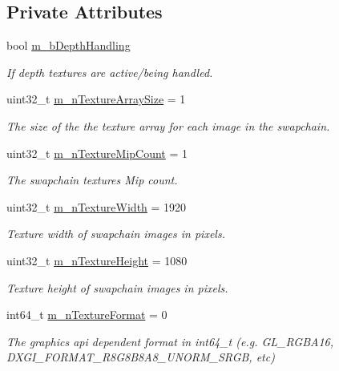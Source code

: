 \subsection*{Private Attributes}
\begin{DoxyCompactItemize}
\item 
bool \mbox{\hyperlink{class_open_x_r_provider_1_1_x_r_render_manager_a4d4e6d227ba36b18b9c25321ab5c21c1}{m\+\_\+b\+Depth\+Handling}}
\begin{DoxyCompactList}\small\item\em If depth textures are active/being handled. \end{DoxyCompactList}\item 
uint32\+\_\+t \mbox{\hyperlink{class_open_x_r_provider_1_1_x_r_render_manager_adcd4b8ab0842133a0e2875b0aab2f68b}{m\+\_\+n\+Texture\+Array\+Size}} = 1
\begin{DoxyCompactList}\small\item\em The size of the the texture array for each image in the swapchain. \end{DoxyCompactList}\item 
uint32\+\_\+t \mbox{\hyperlink{class_open_x_r_provider_1_1_x_r_render_manager_a51f67678cd3a65f4dfc92f62b32aac17}{m\+\_\+n\+Texture\+Mip\+Count}} = 1
\begin{DoxyCompactList}\small\item\em The swapchain textures\textquotesingle{} Mip count. \end{DoxyCompactList}\item 
uint32\+\_\+t \mbox{\hyperlink{class_open_x_r_provider_1_1_x_r_render_manager_a2194cf35100c01e5fe28d9fedac9e2c4}{m\+\_\+n\+Texture\+Width}} = 1920
\begin{DoxyCompactList}\small\item\em Texture width of swapchain images in pixels. \end{DoxyCompactList}\item 
uint32\+\_\+t \mbox{\hyperlink{class_open_x_r_provider_1_1_x_r_render_manager_ae6111a1d0d9d3b6a8d9f0699f08d5f16}{m\+\_\+n\+Texture\+Height}} = 1080
\begin{DoxyCompactList}\small\item\em Texture height of swapchain images in pixels. \end{DoxyCompactList}\item 
int64\+\_\+t \mbox{\hyperlink{class_open_x_r_provider_1_1_x_r_render_manager_a1b4dbf6afd6f407134f5df826ce7d854}{m\+\_\+n\+Texture\+Format}} = 0
\begin{DoxyCompactList}\small\item\em The graphics api dependent format in int64\+\_\+t (e.\+g. G\+L\+\_\+\+R\+G\+B\+A16, D\+X\+G\+I\+\_\+\+F\+O\+R\+M\+A\+T\+\_\+\+R8\+G8\+B8\+A8\+\_\+\+U\+N\+O\+R\+M\+\_\+\+S\+R\+GB, etc) \end{DoxyCompactList}\item 

\end{DoxyCompactItemize}
